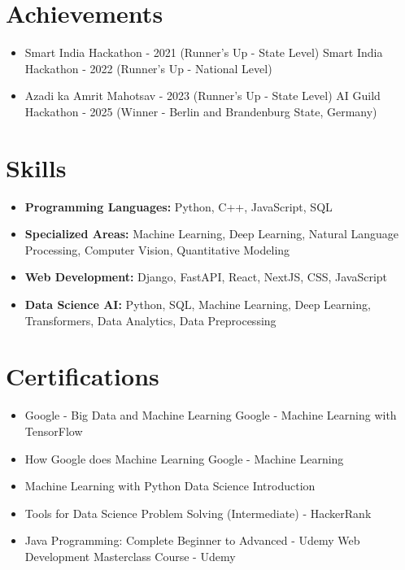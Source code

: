 \documentclass[a4paper,10pt]{article}
\begin{document}
\section*{Achievements}
\begin{itemize}
\item Smart India Hackathon - 2021 (Runner's Up - State Level) \hfill Smart India Hackathon - 2022 (Runner's Up - National Level)
\item Azadi ka Amrit Mahotsav - 2023 (Runner's Up - State Level) \hfill AI Guild Hackathon - 2025 (Winner - Berlin and Brandenburg State, Germany)
\end{itemize}

\section*{Skills}
\begin{itemize}
  \item \textbf{Programming Languages:} Python, C++, JavaScript, SQL
  \item \textbf{Specialized Areas:} Machine Learning, Deep Learning, Natural Language Processing, Computer Vision, Quantitative Modeling
  \item \textbf{Web Development:} Django, FastAPI, React, NextJS, CSS, JavaScript
  \item \textbf{Data Science AI:} Python, SQL, Machine Learning, Deep Learning, Transformers, Data Analytics, Data Preprocessing
\end{itemize}

\section*{Certifications}
\begin{itemize}
\item Google - Big Data and Machine Learning \hfill Google - Machine Learning with TensorFlow
\item How Google does Machine Learning \hfill Google - Machine Learning
\item Machine Learning with Python \hfill Data Science Introduction
\item Tools for Data Science \hfill Problem Solving (Intermediate) - HackerRank
\item Java Programming: Complete Beginner to Advanced - Udemy \hfill Web Development Masterclass Course - Udemy
\end{itemize}
\end{document}
